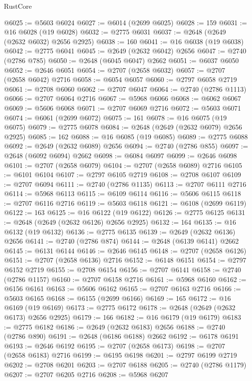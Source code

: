 \begin{lexlean}{RustCore}
\begin{coremodule}
@6025 := @5603 @6024
@6027 := @6014 (@2699 @6025)
@6028 := 159
@6031 := @16 @6028 (@19 @6028)
@6032 := @2775 @6031
@6037 := @2648 (@2649 (@2632 @6032) @2656 @2925)
@6038 := 160
@6041 := @16 @6038 (@19 @6038)
@6042 := @2775 @6041
@6045 := @2649 (@2632 @6042) @2656
@6047 := @2740 (@2786 @785)
@6050 := @2648 (@6045 @6047) @2662
@6051 := @6037 @6050
@6052 := @2646 @6051
@6054 := @2707 (@2658 @6032)
@6057 := @2707 (@2658 @6042) @2716
@6058 := @6054 @6057
@6060 := @2797 @6058 @2719
@6061 := @2708 @6060
@6062 := @2707 @6047
@6064 := @2740 (@2786 @1113)
@6066 := @2707 @6064 @2716
@6067 := @5968 @6066
@6068 := @6062 @6067
@6069 := @5606 @6068
@6071 := @2707 @6069 @2716
@6072 := @5603 @6071
@6074 := @6061 (@2699 @6072)
@6075 := 161
@6078 := @16 @6075 (@19 @6075)
@6079 := @2775 @6078
@6084 := @2648 (@2649 (@2632 @6079) @2656 @2925)
@6085 := 162
@6088 := @16 @6085 (@19 @6085)
@6089 := @2775 @6088
@6092 := @2649 (@2632 @6089) @2656
@6094 := @2740 (@2786 @855)
@6097 := @2648 (@6092 @6094) @2662
@6098 := @6084 @6097
@6099 := @2646 @6098
@6101 := @2707 (@2658 @6079)
@6104 := @2707 (@2658 @6089) @2716
@6105 := @6101 @6104
@6107 := @2797 @6105 @2719
@6108 := @2708 @6107
@6109 := @2707 @6094
@6111 := @2740 (@2786 @1135)
@6113 := @2707 @6111 @2716
@6114 := @5968 @6113
@6115 := @6109 @6114
@6116 := @5606 @6115
@6118 := @2707 @6116 @2716
@6119 := @5603 @6118
@6121 := @6108 (@2699 @6119)
@6122 := 163
@6125 := @16 @6122 (@19 @6122)
@6126 := @2775 @6125
@6131 := @2648 (@2649 (@2632 @6126) @2656 @2925)
@6132 := 164
@6135 := @16 @6132 (@19 @6132)
@6136 := @2775 @6135
@6139 := @2649 (@2632 @6136) @2656
@6141 := @2740 (@2786 @874)
@6144 := @2648 (@6139 @6141) @2662
@6145 := @6131 @6144
@6146 := @2646 @6145
@6148 := @2707 (@2658 @6126)
@6151 := @2707 (@2658 @6136) @2716
@6152 := @6148 @6151
@6154 := @2797 @6152 @2719
@6155 := @2708 @6154
@6156 := @2707 @6141
@6158 := @2740 (@2786 @1157)
@6160 := @2707 @6158 @2716
@6161 := @5968 @6160
@6162 := @6156 @6161
@6163 := @5606 @6162
@6165 := @2707 @6163 @2716
@6166 := @5603 @6165
@6168 := @6155 (@2699 @6166)
@6169 := 165
@6172 := @16 @6169 (@19 @6169)
@6173 := @2775 @6172
@6178 := @2648 (@2649 (@2632 @6173) @2656 @2925)
@6179 := 166
@6182 := @16 @6179 (@19 @6179)
@6183 := @2775 @6182
@6186 := @2649 (@2632 @6183) @2656
@6188 := @2740 (@2786 @890)
@6191 := @2648 (@6186 @6188) @2662
@6192 := @6178 @6191
@6193 := @2646 @6192
@6195 := @2707 (@2658 @6173)
@6198 := @2707 (@2658 @6183) @2716
@6199 := @6195 @6198
@6201 := @2797 @6199 @2719
@6202 := @2708 @6201
@6203 := @2707 @6188
@6205 := @2740 (@2786 @1179)
@6207 := @2707 @6205 @2716
@6208 := @5968 @6207

\end{coremodule}
\end{lexlean}
